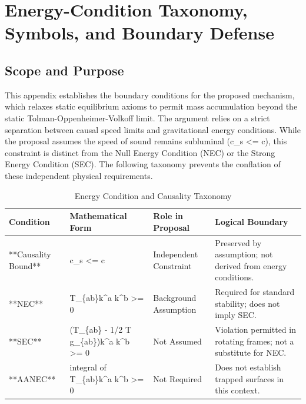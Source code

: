 \documentclass[conference]{IEEEtran}
\begin{document}
\appendices
\section{Energy-Condition Taxonomy, Symbols, and Boundary Defense}
\subsection{Scope and Purpose}
This appendix establishes the boundary conditions for the proposed mechanism, which relaxes static equilibrium axioms to permit mass accumulation beyond the static Tolman-Oppenheimer-Volkoff limit. The argument relies on a strict separation between causal speed limits and gravitational energy conditions. While the proposal assumes the speed of sound remains subluminal (c\_s <= c), this constraint is distinct from the Null Energy Condition (NEC) or the Strong Energy Condition (SEC). The following taxonomy prevents the conflation of these independent physical requirements.

\begin{table}[htbp]
\centering
\footnotesize
\setlength{\tabcolsep}{3pt}
\renewcommand{\arraystretch}{1.12}
\caption{Energy Condition and Causality Taxonomy}
\label{tab:appendix-variables-and-definitions-taxonomy-table}
\begin{tabular}{|p{}|p{}|p{}|p{}|}
\hline
Condition & Mathematical Form & Role in Proposal & Logical Boundary \\\hline
**Causality Bound** & c\_s <= c & Independent Constraint & Preserved by assumption; not derived from energy conditions. \\\hline
**NEC** & T\_\{ab\}k\textasciicircum{}a k\textasciicircum{}b >= 0 & Background Assumption & Required for standard stability; does not imply SEC. \\\hline
**SEC** & (T\_\{ab\} - 1/2 T g\_\{ab\})k\textasciicircum{}a k\textasciicircum{}b >= 0 & Not Assumed & Violation permitted in rotating frames; not a substitute for NEC. \\\hline
**AANEC** & integral of T\_\{ab\}k\textasciicircum{}a k\textasciicircum{}b >= 0 & Not Required & Does not establish trapped surfaces in this context. \\\hline
\end{tabular}
\end{table}
\end{document}
